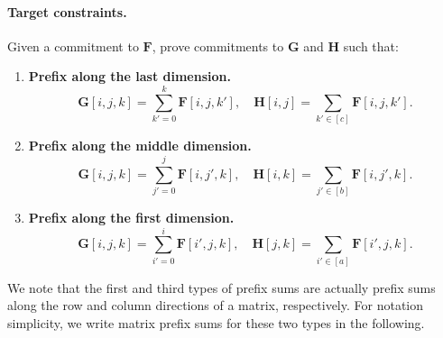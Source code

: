 \paragraph{Target constraints.}
Given a commitment to $\mathbf{F}$, prove commitments to $\mathbf{G}$ and
$\mathbf{H}$ such that:
\begin{enumerate}
    \item \textbf{Prefix along the last dimension.}
    \[
        \mathbf{G}[i,j,k]
        =
        \sum_{k'=0}^{k}\mathbf{F}[i,j,k'],
        \quad
        \mathbf{H}[i,j]
        =
        \sum_{k'\in[c]}\mathbf{F}[i,j,k'].
    \]

    \item \textbf{Prefix along the middle dimension.}
    \[
        \mathbf{G}[i,j,k]
        =
        \sum_{j'=0}^{j}\mathbf{F}[i,j',k],
        \quad
        \mathbf{H}[i,k]
        =
        \sum_{j'\in[b]}\mathbf{F}[i,j',k].
    \]

    \item \textbf{Prefix along the first dimension.}
    \[
        \mathbf{G}[i,j,k]
        =
        \sum_{i'=0}^{i}\mathbf{F}[i',j,k],
        \quad
        \mathbf{H}[j,k]
        =
        \sum_{i'\in[a]}\mathbf{F}[i',j,k].
    \]
\end{enumerate}

We note that the first and third types of prefix sums
  are actually prefix sums along the row and column directions of a matrix, respectively.
  For notation simplicity, we write
  matrix prefix sums for these two types in the following.
